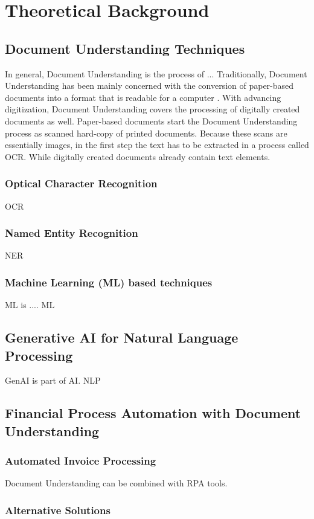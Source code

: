 \chapter{Theoretical Background}

\section{Document Understanding Techniques}
In general, Document Understanding is the process of ...
Traditionally, Document Understanding has been mainly concerned with the conversion of paper-based documents into a format that is readable for a computer \cite{taylor1994integrated}. With advancing digitization, Document Understanding covers the processing of digitally created documents as well. Paper-based documents start the Document Understanding process as scanned hard-copy of printed documents. Because these scans are essentially images, in the first step the text has to be extracted in a process called \ac{OCR}. While digitally created documents already contain text elements. 
\subsection{Optical Character Recognition}
\ac{OCR}
\subsection{Named Entity Recognition}
\ac{NER}
\subsection{Machine Learning (ML) based techniques}
\ac{ML} is .... \ac{ML}
\section{Generative AI for Natural Language Processing}
\ac{GenAI} is part of \ac{AI}.
\ac{NLP}
\section{Financial Process Automation with Document Understanding}
\subsection{Automated Invoice Processing}
Document Understanding can be combined with \ac{RPA} tools.
\subsection{Alternative Solutions}